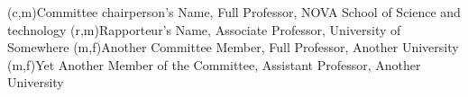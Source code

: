 %
%
%
%
(c,m){Committee chairperson's Name, Full Professor, NOVA School of Science and technology}
(r,m){Rapporteur's Name, Associate Professor, University of Somewhere}
(m,f){Another Committee Member, Full Professor, Another University}
(m,f){Yet Another Member of the Committee, Assistant Professor, Another University}
